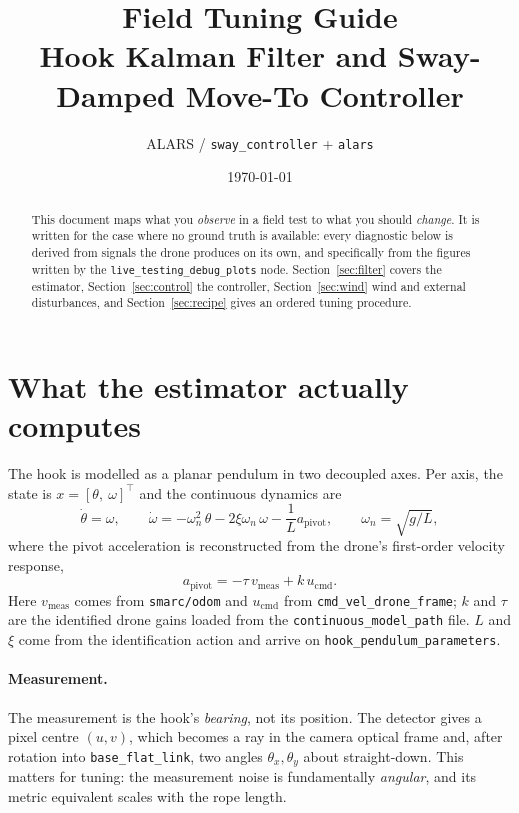 \documentclass[11pt,a4paper]{article}
\title{Field Tuning Guide\\[0.3em]
\large Hook Kalman Filter and Sway-Damped Move-To Controller}
\author{ALARS / \texttt{sway\_controller} + \texttt{alars}}
\date{\today}
\newcommand{\param}[1]{\texttt{\small #1}}
\newcommand{\topicname}[1]{\texttt{\small #1}}
\begin{document}
\maketitle

\begin{abstract}
\noindent
This document maps what you \emph{observe} in a field test to what you should
\emph{change}. It is written for the case where no ground truth is available:
every diagnostic below is derived from signals the drone produces on its own,
and specifically from the figures written by the
\param{live\_testing\_debug\_plots} node. Section~\ref{sec:filter} covers the
estimator, Section~\ref{sec:control} the controller, Section~\ref{sec:wind}
wind and external disturbances, and Section~\ref{sec:recipe} gives an ordered
tuning procedure.
\end{abstract}

\tableofcontents

\section{What the estimator actually computes}
\label{sec:model}

The hook is modelled as a planar pendulum in two decoupled axes. Per axis, the
state is $x=[\theta,\ \omega]^\top$ and the continuous dynamics are
%
\begin{equation}
\dot\theta = \omega,
\qquad
\dot\omega = -\omega_n^2\,\theta - 2\xi\omega_n\,\omega - \frac{1}{L}a_{\text{pivot}},
\qquad
\omega_n=\sqrt{g/L},
\end{equation}
%
where the pivot acceleration is reconstructed from the drone's first-order
velocity response,
%
\begin{equation}
a_{\text{pivot}} = -\tau\,v_{\text{meas}} + k\,u_{\text{cmd}} .
\label{eq:pivot}
\end{equation}
%
Here $v_{\text{meas}}$ comes from \topicname{smarc/odom} and $u_{\text{cmd}}$
from \topicname{cmd\_vel\_drone\_frame}; $k$ and $\tau$ are the identified
drone gains loaded from the \param{continuous\_model\_path} file. $L$ and $\xi$
come from the identification action and arrive on
\topicname{hook\_pendulum\_parameters}.

\paragraph{Measurement.}
The measurement is the hook's \emph{bearing}, not its position. The detector
gives a pixel centre $(u,v)$, which becomes a ray in the camera optical frame
and, after rotation into \texttt{base\_flat\_link}, two angles
$\theta_x,\theta_y$ about straight-down. This matters for tuning: the
measurement noise is fundamentally \emph{angular}, and its metric equivalent
scales with the rope length.
\end{document}
